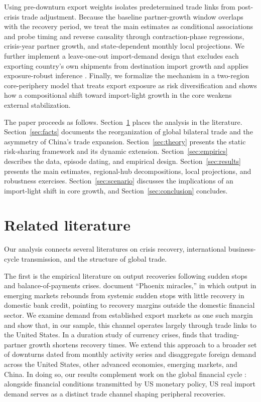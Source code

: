 \documentclass[12pt, a4paper]{article}
\begin{document}
Using pre-downturn export weights isolates predetermined trade links from post-crisis trade adjustment. Because the baseline partner-growth window overlaps with the recovery period, we treat the main estimates as conditional associations and probe timing and reverse causality through contraction-phase regressions, crisis-year partner growth, and state-dependent monthly local projections. We further implement a leave-one-out import-demand design that excludes each exporting country's own shipments from destination import growth and applies exposure-robust inference \citep{adao2019, borusyak2022}. Finally, we formalize the mechanism in a two-region core-periphery model that treats export exposure as risk diversification and shows how a compositional shift toward import-light growth in the core weakens external stabilization.

The paper proceeds as follows. Section~\ref{sec:lit} places the analysis in the literature. Section~\ref{sec:facts} documents the reorganization of global bilateral trade and the asymmetry of China's trade expansion. Section~\ref{sec:theory} presents the static risk-sharing framework and its dynamic extension. Section~\ref{sec:empirics} describes the data, episode dating, and empirical design. Section~\ref{sec:results} presents the main estimates, regional-hub decompositions, local projections, and robustness exercises. Section~\ref{sec:scenario} discusses the implications of an import-light shift in core growth, and Section~\ref{sec:conclusion} concludes.

\section{Related literature}\label{sec:lit}

Our analysis connects several literatures on crisis recovery, international business-cycle transmission, and the structure of global trade.

The first is the empirical literature on output recoveries following sudden stops and balance-of-payments crises. \citet{calvo2006} document ``Phoenix miracles,'' in which output in emerging markets rebounds from systemic sudden stops with little recovery in domestic bank credit, pointing to recovery margins outside the domestic financial sector. We examine demand from established export markets as one such margin and show that, in our sample, this channel operates largely through trade links to the United States. In a duration study of currency crises, \citet{deb2006} finds that trading-partner growth shortens recovery times. We extend this approach to a broader set of downturns dated from monthly activity series and disaggregate foreign demand across the United States, other advanced economies, emerging markets, and China. In doing so, our results complement work on the global financial cycle \citep{rey2013}: alongside financial conditions transmitted by US monetary policy, US real import demand serves as a distinct trade channel shaping peripheral recoveries.
\end{document}
